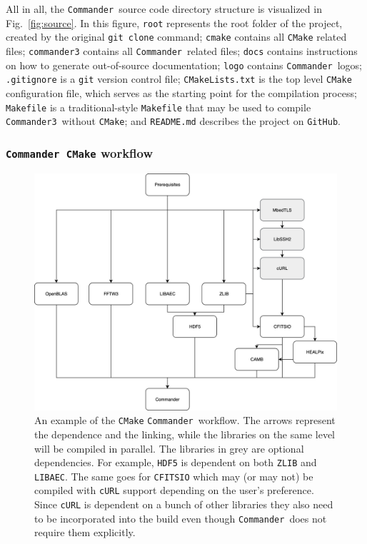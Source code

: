 \documentclass[twocolumn]{aa}
\def\commander{\texttt{Commander}}
\def\commanderthree{\texttt{Commander3}}
\begin{document}
All in all, the \commander\ source code directory structure is visualized in Fig.~\ref{fig:source}. In this figure, \texttt{root} represents the root folder of the project, created by the original \texttt{git clone} command; \texttt{cmake} contains all \texttt{CMake} related files; \texttt{commander3} contains all \commander\ related files; \texttt{docs} contains instructions on how to generate out-of-source documentation; \texttt{logo} contains \commander\ logos; \texttt{.gitignore} is a \texttt{git} version control file; \texttt{CMakeLists.txt} is the top level \texttt{CMake} configuration file, which serves as the starting point for the compilation process; \texttt{Makefile} is a traditional-style \texttt{Makefile} that may be used to compile \commanderthree\ without \texttt{CMake}; and \texttt{README.md} describes the project on \texttt{GitHub}.


\subsubsection{\commander\ \texttt{CMake} workflow}
\label{sec:cmake-code-organization}

\begin{figure}[t]
      \center
      \includegraphics[scale=0.75]{figures/Commander_CMake_workflow.png}
      \caption{An example of the \texttt{CMake} \commander\ workflow. 
      The arrows represent the dependence and the linking, while the libraries 
      on the same level will be compiled in parallel. The libraries in grey are 
      optional dependencies. For example, \texttt{HDF5} is dependent on both \texttt{ZLIB} and \texttt{LIBAEC}. 
      The same goes for \texttt{CFITSIO} which may (or may not) be compiled with \texttt{cURL} 
      support depending on the user's preference. Since \texttt{cURL} is dependent on 
      a bunch of other libraries they also need to be incorporated into the build 
      even though \commander\ does not require them explicitly. 
      }
      \label{fig:cmake-workflow}
\end{figure}
\end{document}
